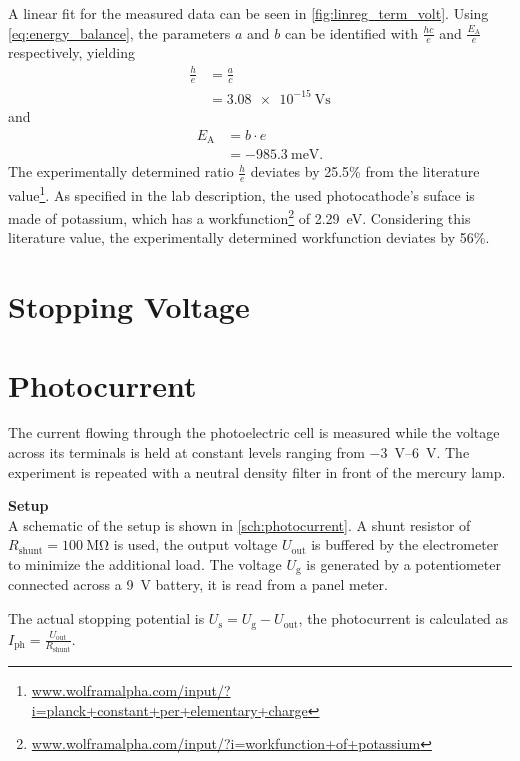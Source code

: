 A linear fit for the measured data can be seen in \autoref{fig:linreg_term_volt}.
Using \autoref{eq:energy_balance}, the parameters $a$ and $b$ can be identified with $\frac{hc}{e}$ and $\frac{E_\text{A}}{e}$ respectively, yielding
\begin{align*}
	\frac{h}{e} &= \frac{a}{c} \\
	&=\SI{3.08e-15}{\volt\second}
\end{align*}
and
\begin{align*}
	E_\text{A} &= b\cdot e \\
	&=\SI{-985.3}{\milli\eV}.
\end{align*}
The experimentally determined ratio $\frac{h}{e}$ deviates by \num{25.5}\% from the literature value\footnote{\url{www.wolframalpha.com/input/?i=planck+constant+per+elementary+charge}}.
As specified in the lab description, the used photocathode's suface is made of potassium, which has a workfunction\footnote{\url{www.wolframalpha.com/input/?i=workfunction+of+potassium}} of \SI{2.29}{\eV}.
Considering this literature value, the experimentally determined workfunction deviates by \num{56}\%.
\section{Stopping Voltage}%


\section{Photocurrent}%

The current flowing through the photoelectric cell is measured while the voltage across its terminals is held at constant levels ranging from \SIrange{-3}{6}{\volt}.
The experiment is repeated with a neutral density filter in front of the mercury lamp.

\textbf{Setup}\\
A schematic of the setup is shown in \autoref{sch:photocurrent}.
A shunt resistor of $R_\text{shunt} = \SI{100}{\mega\ohm}$ is used, the output voltage $U_\text{out}$ is buffered by the electrometer to minimize the additional load.
The voltage $U_\text{g}$ is generated by a potentiometer connected across a \SI{9}{\volt} battery, it is read from a panel meter.

The actual stopping potential is $U_\text{s} = U_\text{g} - U_\text{out}$, the photocurrent is calculated as $I_\text{ph} = \frac{U_\text{out}}{R_\text{shunt}}$.

